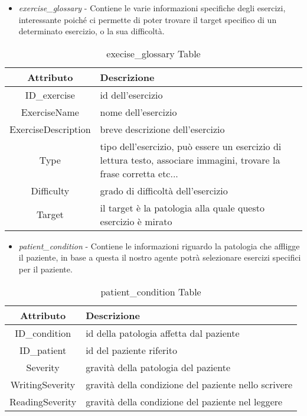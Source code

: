 \documentclass{article}
\begin{document}
\pagebreak

\begin{itemize}
\item     \textit{exercise\_glossary} - Contiene le varie informazioni specifiche degli esercizi, interessante poiché ci permette di poter trovare il target specifico di un determinato esercizio, o la sua difficoltà.
\end{itemize}

    \begin{table}[h]
        \centering
        \caption{execise\_glossary Table}
        \begin{tabular}{|c|p{8cm}|}
            \hline
            \textbf{Attributo} & \textbf{Descrizione} \\
            \hline
                ID\_exercise & id dell'esercizio\\
            \hline
                ExerciseName & nome dell'esercizio\\
            \hline
                ExerciseDescription & breve descrizione dell'esercizio\\
            \hline
                Type & tipo dell'esercizio, può essere un esercizio di lettura testo, associare immagini, trovare la frase corretta etc...\\
            \hline
                Difficulty & grado di difficoltà dell'esercizio\\
            \hline
                Target & il target è la patologia alla quale questo esercizio è mirato\\
            \hline
        \end{tabular}
    \end{table}

\begin{itemize}
\item     \textit{patient\_condition} - Contiene le informazioni riguardo la patologia che affligge il paziente, in base a questa il nostro agente potrà selezionare esercizi specifici per il paziente.
\end{itemize}

    \begin{table}[h]
        \centering
        \caption{patient\_condition Table}
        \begin{tabular}{|c|p{8cm}|}
            \hline
            \textbf{Attributo} & \textbf{Descrizione} \\
            \hline
                ID\_condition & id della patologia affetta dal paziente\\
            \hline
                ID\_patient & id del paziente riferito\\
            \hline
                Severity & gravità della patologia del paziente \\
            \hline
                WritingSeverity & gravità della condizione del paziente nello scrivere\\
            \hline
                ReadingSeverity & gravità della condizione del paziente nel leggere\\
            \hline
        \end{tabular}
    \end{table}
\end{document}
